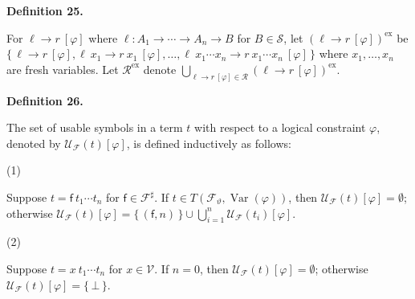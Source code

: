  
 
\par\medskip\noindent\textbf{Definition 25.}\par
 
 
For ${\ell}\rightarrow{r}\ [\varphi]$ where $\ell:{A}_{1}\rightarrow\cdots\rightarrow{A}_{n}\rightarrow B$ for $B\in\mathcal{S}$, let $({\ell}\rightarrow{r}\ [\varphi])^{\mathrm{ex}}$ be $\{\,{\ell}\rightarrow{r}\ [\varphi],{{\ell}\ {x_{1}}}\rightarrow{{r}\ {x_{1}}}\ [\varphi],\ldots,{{\ell}\ {{x}_{1}\cdots{x}_{n}}}\rightarrow{{r}\ {{x}_{1}\cdots{x}_{n}}}\ [\varphi]\,\}$ where ${x}_{1},\ldots,{x}_{n}$ are fresh variables. Let $\mathcal{R}^{\mathrm{ex}}$ denote $\bigcup_{{\ell}\rightarrow{r}\ [\varphi]\in\mathcal{R}}({\ell}\rightarrow{r}\ [\varphi])^{\mathrm{ex}}$.\par
 
 
 
 
\par\medskip\noindent\textbf{Definition 26.}\par
 
 
The set of usable symbols in a term $t$ with respect to a logical constraint $\varphi$, denoted by $\mathcal{U}_{\mathcal{F}}(t)[\varphi]$, is defined inductively as follows:\par
  
\par\noindent  (1) 
 
Suppose $t={\mathsf{f}}\ {{t}_{1}\cdots{t}_{n}}$ for $\mathsf{f}\in\mathcal{F}^{\sharp}$. If $t\in T({\mathcal{F}}_{\vartheta},\operatorname{Var}(\varphi))$, then $\mathcal{U}_{\mathcal{F}}(t)[\varphi]=\emptyset$; otherwise $\mathcal{U}_{\mathcal{F}}(t)[\varphi]=\{\,(\mathsf{f},n)\,\}\cup\bigcup_{i=1}^{n}\mathcal{U}_{\mathcal{F}}(t_{i})[\varphi]$.\par
 
 
 
\par\noindent  (2) 
 
Suppose $t={x}\ {{t}_{1}\cdots{t}_{n}}$ for $x\in\mathcal{V}$. If $n=0$, then $\mathcal{U}_{\mathcal{F}}(t)[\varphi]=\emptyset$; otherwise $\mathcal{U}_{\mathcal{F}}(t)[\varphi]=\{\,\bot\,\}$.\par
 

